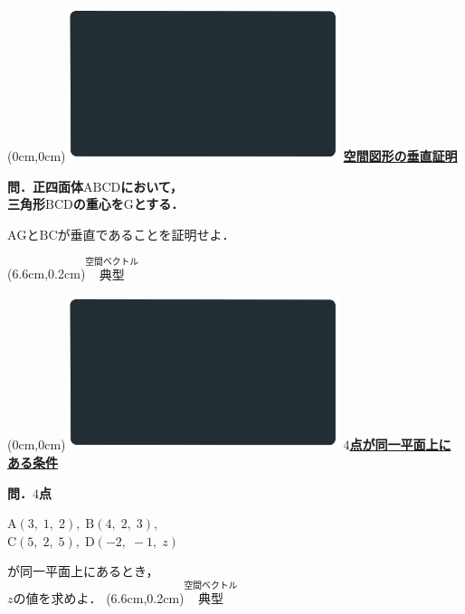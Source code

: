\documentclass[10pt,
fleqn,
dvipdfmx,
uplatex
]{jsarticle}
\begin{document}
\newpage



\at(0cm,0cm){\includegraphics[width=8cm,bb=0 0 1920 1080]{./media_local/smart_background/空間ベクトル.jpeg}}
{\color{orange}\bf\boldmath\LARGE\underline{空間図形の垂直証明}}\vspace{0.3zw}

\Large 
\bf\boldmath 問．正四面体$\text{ABCD}$において，\\
三角形$\text{BCD}$の重心を$\text{G}$とする．

\LARGE 
$\text{AG}$と$\text{BC}$が垂直であることを証明せよ．

\at(6.6cm,0.2cm){\small\color{bradorange}$\overset{\text{空間ベクトル}}{\text{典型}}$}


\newpage



\at(0cm,0cm){\includegraphics[width=8cm,bb=0 0 1920 1080]{./media_local/smart_background/空間ベクトル.jpeg}}
{\color{orange}\bf\boldmath\Large\underline{$4$点が同一平面上にある条件}}\vspace{0.3zw}

\Large 
\bf\boldmath 問．$4$点

\normalsize
\hspace{3zw}$\text{A}\left(3,\;1,\;2\right),\;\text{B}\left(4,\;2,\;3\right)$,\;\\
\hspace{3zw}$\text{C}\left(5,\;2,\;5\right),\;\text{D}\left(-2,\;-1,\;z\right)$

\Large 
が同一平面上にあるとき，\\
\hfill$z$の値を求めよ．
\at(6.6cm,0.2cm){\small\color{bradorange}$\overset{\text{空間ベクトル}}{\text{典型}}$}
\end{document}
